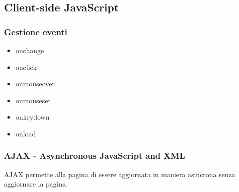 \subsection{Client-side JavaScript}
\subsubsection{Gestione eventi}
\begin{itemize}
    \item onchange
    \item onclick
    \item onmouseover
    \item onmouseset
    \item onkeydown
    \item onload
\end{itemize}
\subsubsection{AJAX - Asynchronous JavaScript and XML}
AJAX permette alla pagina di essere aggiornata in maniera asincrona senza aggiornare la pagina.
